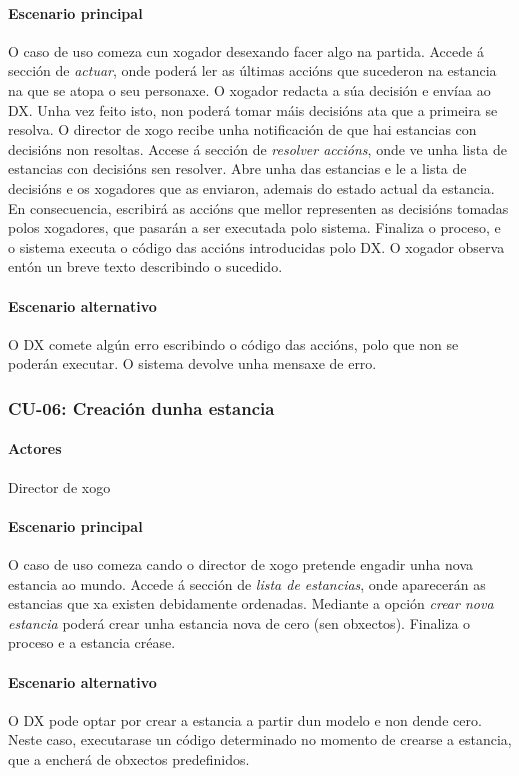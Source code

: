 \paragraph{Escenario principal}
O caso de uso comeza cun xogador desexando facer algo na partida. Accede á sección de {\it actuar}, onde poderá ler as últimas accións que sucederon na estancia na que se atopa o seu personaxe. O xogador redacta a súa decisión e envíaa ao DX. Unha vez feito isto, non poderá tomar máis decisións ata que a primeira se resolva.
O director de xogo recibe unha notificación de que hai estancias con decisións non resoltas. Accese á sección de {\it resolver accións}, onde ve unha lista de estancias con decisións sen resolver. Abre unha das estancias e le a lista de decisións e os xogadores que as enviaron, ademais do estado actual da estancia. En consecuencia, escribirá as accións que mellor representen as decisións tomadas polos xogadores, que pasarán a ser executada polo sistema. Finaliza o proceso, e o sistema executa o código das accións introducidas polo DX. O xogador observa entón un breve texto describindo o sucedido.

\paragraph{Escenario alternativo}
O DX comete algún erro escribindo o código das accións, polo que non se poderán executar. O sistema devolve unha mensaxe de erro.

\subsubsection{CU-06: Creación dunha estancia}
\paragraph{Actores}
Director de xogo
\paragraph{Escenario principal}
O caso de uso comeza cando o director de xogo pretende engadir unha nova estancia ao mundo. Accede á sección de {\it lista de estancias}, onde aparecerán as estancias que xa existen debidamente ordenadas. Mediante a opción {\it crear nova estancia} poderá crear unha estancia nova de cero (sen obxectos). Finaliza o proceso e a estancia créase.

\paragraph{Escenario alternativo}
O DX pode optar por crear a estancia a partir dun modelo e non dende cero. Neste caso, executarase un código determinado no momento de crearse a estancia, que a encherá de obxectos predefinidos.

